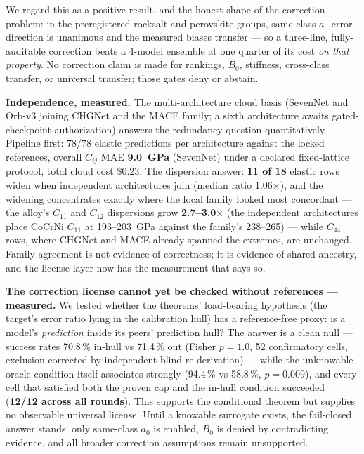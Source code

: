 \documentclass[11pt]{article}
\theoremstyle{definition}
\theoremstyle{remark}
\begin{document}
We regard this as a positive result, and the honest shape of the correction problem: in the preregistered rocksalt and perovskite groups, same-class $a_0$ error direction is unanimous and the measured biases transfer --- so a three-line, fully-auditable correction beats a 4-model ensemble at one quarter of its cost \emph{on that property}. No correction claim is made for rankings, $B_0$, stiffness, cross-class transfer, or universal transfer; those gates deny or abstain.

\medskip
\noindent\textbf{Independence, measured.} The multi-architecture cloud basis (SevenNet and Orb-v3 joining CHGNet and the MACE family; a sixth architecture awaits gated-checkpoint authorization) answers the redundancy question quantitatively. Pipeline first: 78/78 elastic predictions per architecture against the locked references, overall $C_{ij}$ MAE \textbf{9.0~GPa} (SevenNet) under a declared fixed-lattice protocol, total cloud cost \$0.23. The dispersion answer: \textbf{11 of 18} elastic rows widen when independent architectures join (median ratio 1.06$\times$), and the widening concentrates exactly where the local family looked most concordant --- the alloy's $C_{11}$ and $C_{12}$ dispersions grow \textbf{2.7--3.0$\times$} (the independent architectures place CoCrNi $C_{11}$ at 193--203~GPa against the family's 238--265) --- while $C_{44}$ rows, where CHGNet and MACE already spanned the extremes, are unchanged. Family agreement is not evidence of correctness; it is evidence of shared ancestry, and the license layer now has the measurement that says so.

\medskip
\noindent\textbf{The correction license cannot yet be checked without references --- measured.} We tested whether the theorems' load-bearing hypothesis (the target's error ratio lying in the calibration hull) has a reference-free proxy: is a model's \emph{prediction} inside its peers' prediction hull? The answer is a clean null --- success rates 70.8\,\% in-hull vs 71.4\,\% out (Fisher $p = 1.0$, 52 confirmatory cells, exclusion-corrected by independent blind re-derivation) --- while the unknowable oracle condition itself associates strongly (94.4\,\% vs 58.8\,\%, $p = 0.009$), and every cell that satisfied both the proven cap and the in-hull condition succeeded (\textbf{12/12 across all rounds}). This supports the conditional theorem but supplies no observable universal license. Until a knowable surrogate exists, the fail-closed answer stands: only same-class $a_0$ is enabled, $B_0$ is denied by contradicting evidence, and all broader correction assumptions remain unsupported.
\end{document}
